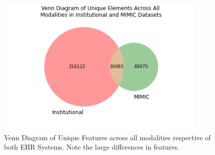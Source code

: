 \documentclass[pmlr]{jmlr}%
\begin{document}
{\begin{figure}[h!]
\vskip 0.2in
\begin{center}
\label{bar}
\centerline{\includegraphics[width=4in]{plots/venn.png}}
\caption{Venn Diagram of Unique Features across all modalities respective of both EHR Systems. Note the large differences in features.}
\label{venn}
\end{center}
\vskip -0.2in
\end{figure}

\vspace*{-0.5cm}





}
\end{document}
